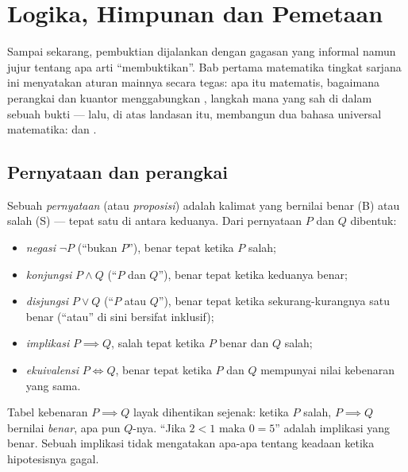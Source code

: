 \chapter{Logika, Himpunan dan Pemetaan}\label{ch:b1:logic}

Sampai sekarang, pembuktian dijalankan dengan gagasan yang informal
namun jujur tentang apa arti ``membuktikan''. Bab pertama matematika
tingkat sarjana ini menyatakan aturan mainnya secara tegas: apa itu
 matematis, bagaimana perangkai dan kuantor menggabungkan
, langkah mana yang sah di dalam sebuah bukti --- lalu, di
atas landasan itu, membangun dua bahasa universal matematika: 
dan .

\section{Pernyataan dan perangkai}

\begin{definition}\label{def:b1:logic:statement}
Sebuah \emph{pernyataan} (atau \emph{proposisi})
adalah kalimat yang bernilai benar (B) atau salah (S) --- tepat satu di
antara keduanya. Dari pernyataan $P$ dan $Q$ dibentuk:
\begin{itemize}
  \item \emph{negasi} $\lnot P$ (``bukan $P$''), benar tepat ketika
        $P$ salah;
  \item \emph{konjungsi} $P \land Q$ (``$P$ dan $Q$''), benar tepat
        ketika keduanya benar;
  \item \emph{disjungsi} $P \lor Q$ (``$P$ atau $Q$''), benar tepat
        ketika sekurang-kurangnya satu benar (``atau'' di sini bersifat
        inklusif);
  \item \emph{implikasi} $P \implies Q$, salah tepat ketika $P$
        benar dan $Q$ salah;
  \item \emph{ekuivalensi} $P \iff Q$, benar tepat ketika $P$ dan
        $Q$ mempunyai nilai kebenaran yang sama.
\end{itemize}
\end{definition}

\begin{remark}
Tabel kebenaran $P \implies Q$ layak dihentikan sejenak: ketika $P$
salah, $P \implies Q$ bernilai \emph{benar}, apa pun $Q$-nya. ``Jika
$2 < 1$ maka $0 = 5$'' adalah implikasi yang benar. Sebuah implikasi
tidak mengatakan apa-apa tentang keadaan ketika hipotesisnya gagal.
\end{remark}

